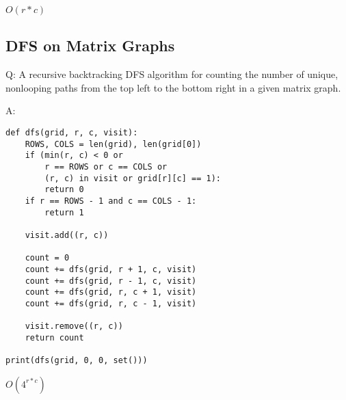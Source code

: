 \documentclass[8pt, table, xcdraw]{article}%
\begin{document}
 $O(r*c)$

\subsection{DFS on Matrix Graphs}

Q: A recursive backtracking DFS algorithm for counting the number of unique, nonlooping paths from the top left to the bottom right in a given matrix graph.

A:

\begin{lstlisting}
def dfs(grid, r, c, visit):
    ROWS, COLS = len(grid), len(grid[0])
    if (min(r, c) < 0 or
        r == ROWS or c == COLS or
        (r, c) in visit or grid[r][c] == 1):
        return 0
    if r == ROWS - 1 and c == COLS - 1:
        return 1

    visit.add((r, c))

    count = 0
    count += dfs(grid, r + 1, c, visit)
    count += dfs(grid, r - 1, c, visit)
    count += dfs(grid, r, c + 1, visit)
    count += dfs(grid, r, c - 1, visit)

    visit.remove((r, c))
    return count
	
print(dfs(grid, 0, 0, set()))
\end{lstlisting}

$O(4^{r*c})$
\end{document}
